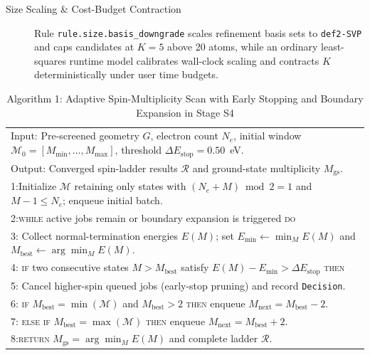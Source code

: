 \documentclass[journal=jctcce,manuscript=article]{achemso}
\begin{document}
\begin{description}
  \item[Size Scaling \& Cost-Budget Contraction] Rule \texttt{rule.size.basis\_downgrade} scales refinement basis sets to \texttt{def2-SVP} and caps candidates at $K=5$ above 20 atoms, while an ordinary least-squares runtime model calibrates wall-clock scaling and contracts $K$ deterministically under user time budgets.
\end{description}

\begin{table}[htbp]
  \centering
  \caption{Algorithm 1: Adaptive Spin-Multiplicity Scan with Early Stopping and Boundary Expansion in Stage S4}
  \label{tab:alg1}
  \small
  \begin{tabular}{p{14.8cm}}
    \toprule
    Input: Pre-screened geometry $G$, electron count $N_e$, initial window $\mathcal{M}_0 = [M_{\min}, \dots, M_{\max}]$, threshold $\Delta E_{\text{stop}} = 0.50$~eV. \\
    Output: Converged spin-ladder results $\mathcal{R}$ and ground-state multiplicity $M_{\text{gs}}$. \\
    \midrule
    1:\quad Initialize $\mathcal{M}$ retaining only states with $(N_e + M) \bmod 2 = 1$ and $M - 1 \le N_e$; enqueue initial batch. \\
    2:\quad \textsc{while} active jobs remain or boundary expansion is triggered \textsc{do} \\
    3:\quad \hspace{1.2em} Collect normal-termination energies $E(M)$; set $E_{\min} \leftarrow \min_M E(M)$ and $M_{\text{best}} \leftarrow \arg\min_M E(M)$. \\
    4:\quad \hspace{1.2em} \textsc{if} two consecutive states $M > M_{\text{best}}$ satisfy $E(M) - E_{\min} > \Delta E_{\text{stop}}$ \textsc{then} \\
    5:\quad \hspace{2.4em} Cancel higher-spin queued jobs (early-stop pruning) and record \texttt{Decision}. \\
    6:\quad \hspace{1.2em} \textsc{if} $M_{\text{best}} = \min(\mathcal{M})$ and $M_{\text{best}} > 2$ \textsc{then} enqueue $M_{\text{next}} = M_{\text{best}} - 2$. \\
    7:\quad \hspace{1.2em} \textsc{else if} $M_{\text{best}} = \max(\mathcal{M})$ \textsc{then} enqueue $M_{\text{next}} = M_{\text{best}} + 2$. \\
    8:\quad \textsc{return} $M_{\text{gs}} = \arg\min_M E(M)$ and complete ladder $\mathcal{R}$. \\
    \bottomrule
  \end{tabular}
\end{table}
\end{document}

